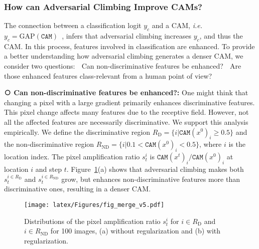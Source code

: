 \documentclass[final]{cvpr}
\begin{document}
\subsubsection{How can Adversarial Climbing Improve CAMs?}\label{how_advcam}

The connection between a classification logit $y_c$ and a CAM, \textit{i.e.} $y_c = \text{GAP}(\texttt{CAM})$~\cite{zhang2018adversarial}, infers that adversarial climbing increases $y_c$, and thus the CAM. 
In this process, features involved in classification are enhanced.
To provide a better understanding how adversarial climbing generates a denser CAM, we consider two questions: \textcircled{\raisebox{-0.9pt}{1}} Can non-discriminative features be enhanced? \textcircled{\raisebox{-0.9pt}{2}} Are those enhanced features class-relevant from a human point of view?



\textbf{\textcircled{\raisebox{-0.9pt}{1}} Can non-discriminative features be enhanced?:} One might think that changing a pixel with a large gradient primarily enhances discriminative features. 
This pixel change affects many features due to the receptive field. However, not all the affected features are necessarily discriminative.
We support this analysis empirically.
We define the discriminative region $R_\text{D} \!=\! \{i|\texttt{CAM}(x^{0})_i\!\geq\!0.5\}$ and the non-discriminative region $R_{\text{ND}} \!=\! \{i|0.1\!<\!\texttt{CAM}(x^{0})_i\!<\!0.5\}$, where $i$ is the location index. 
The pixel amplification ratio $s^i_t$ is $\texttt{CAM}(x^{t})_i/\texttt{CAM}(x^{0})_i$ at location $i$ and step $t$.
Figure~\ref{fig_amp}(a) shows that adversarial climbing makes both $s^{i \in {R_\text{D}}}_t$ and $s^{i \in {R_{\text{ND}}}}_t$ grow, but enhances non-discriminative features more than discriminative ones, resulting in a denser CAM.

\begin{figure}[t]
\centering
\texttt{[image: latex/Figures/fig\_merge\_v5.pdf]}
\vspace{-2em}
\caption{\label{fig_amp} Distributions of the pixel amplification ratio $s^i_t$ for $i \in R_\text{D}$ and $i \in R_{\text{ND}}$ for 100 images, (a) without regularization and (b) with regularization.}
\vspace{-1em}
\end{figure}
 
\end{document}

